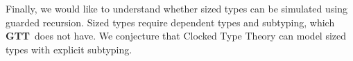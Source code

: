 \documentclass[a4paper,UKenglish,cleveref, autoref,numberwithinsect]{lipics-v2019}
\newcommand{\GTT}{\textbf{GTT}}
\begin{document}
Finally, we would like to understand whether sized types can be simulated using guarded recursion.
Sized types require dependent types and subtyping, which \GTT\ does not have.
We conjecture that Clocked Type Theory \cite{BahrGM17} can model sized types with explicit subtyping.



\end{document}

